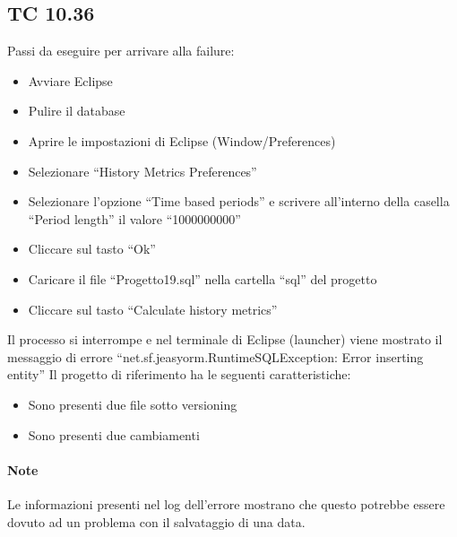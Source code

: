 \subsection*{TC 10.36}
Passi da eseguire per arrivare alla failure:
\begin{itemize}
 \item Avviare Eclipse
 \item Pulire il database
 \item Aprire le impostazioni di Eclipse (Window/Preferences)
 \item Selezionare ``History Metrics Preferences''
 \item Selezionare l'opzione ``Time based periods'' e scrivere all'interno della casella ``Period length'' il valore ``1000000000''
 \item Cliccare sul tasto ``Ok''
 \item Caricare il file ``Progetto19.sql'' nella cartella ``sql'' del progetto
 \item Cliccare sul tasto ``Calculate history metrics''
\end{itemize}
Il processo si interrompe e nel terminale di Eclipse (launcher) viene mostrato il messaggio di errore ``net.sf.jeasyorm.RuntimeSQLException: Error inserting entity''
\newline
Il progetto di riferimento ha le seguenti caratteristiche:
\begin{itemize}
 \item Sono presenti due file sotto versioning
 \item Sono presenti due cambiamenti
\end{itemize}

\paragraph{Note} Le informazioni presenti nel log dell'errore mostrano che questo potrebbe essere dovuto ad un problema con il salvataggio di una data.





\newpage







